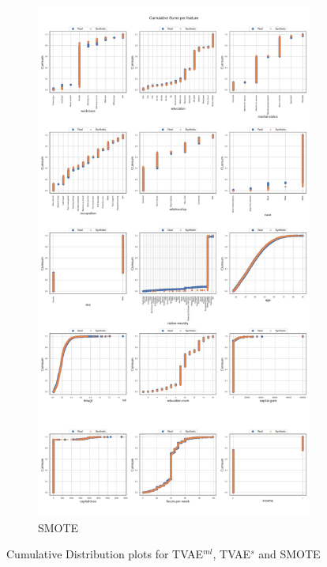 \begin{landscape}
\begin{figure}[h]
\begin{subfigure}{0.3\linewidth}
			\includegraphics[height=\textheight,width=\linewidth,keepaspectratio]{images/cumsums/smote.jpg}
			\caption{SMOTE}
		\end{subfigure}
		\caption[Cumulative Distribution plots Baseline Models]{Cumulative Distribution plots for TVAE$^{ml}$, TVAE$^s$ and SMOTE}
		\label{fig_a:cumsum_2}
	\end{figure}
\end{landscape}
